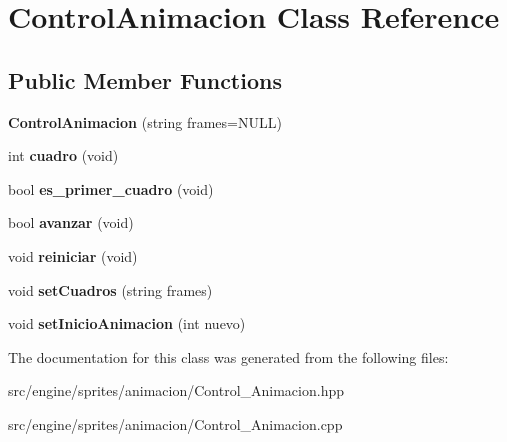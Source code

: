 \hypertarget{class_control_animacion}{}\section{Control\+Animacion Class Reference}
\label{class_control_animacion}
\subsection*{Public Member Functions}
\begin{DoxyCompactItemize}
\item 
{\bfseries Control\+Animacion} (string frames=N\+U\+LL)\hypertarget{class_control_animacion_a6d077c733c0d637f5a27e925f750fac2}{}\label{class_control_animacion_a6d077c733c0d637f5a27e925f750fac2}

\item 
int {\bfseries cuadro} (void)\hypertarget{class_control_animacion_a510c44c25f1d5acaa82ca67e82d52d82}{}\label{class_control_animacion_a510c44c25f1d5acaa82ca67e82d52d82}

\item 
bool {\bfseries es\+\_\+primer\+\_\+cuadro} (void)\hypertarget{class_control_animacion_a73a85ab3fccb53b1457744470daf8ec3}{}\label{class_control_animacion_a73a85ab3fccb53b1457744470daf8ec3}

\item 
bool {\bfseries avanzar} (void)\hypertarget{class_control_animacion_a2be12a01bfdd0ce76fc5a826fa8770ef}{}\label{class_control_animacion_a2be12a01bfdd0ce76fc5a826fa8770ef}

\item 
void {\bfseries reiniciar} (void)\hypertarget{class_control_animacion_a801e3d019765ece628db6626062e4453}{}\label{class_control_animacion_a801e3d019765ece628db6626062e4453}

\item 
void {\bfseries set\+Cuadros} (string frames)\hypertarget{class_control_animacion_a59575c0affda112129413a1983cc7ca5}{}\label{class_control_animacion_a59575c0affda112129413a1983cc7ca5}

\item 
void {\bfseries set\+Inicio\+Animacion} (int nuevo)\hypertarget{class_control_animacion_a59dec38d54106ecfaabbc90db2c1968a}{}\label{class_control_animacion_a59dec38d54106ecfaabbc90db2c1968a}

\end{DoxyCompactItemize}


The documentation for this class was generated from the following files\+:\begin{DoxyCompactItemize}
\item 
src/engine/sprites/animacion/Control\+\_\+\+Animacion.\+hpp\item 
src/engine/sprites/animacion/Control\+\_\+\+Animacion.\+cpp\end{DoxyCompactItemize}
